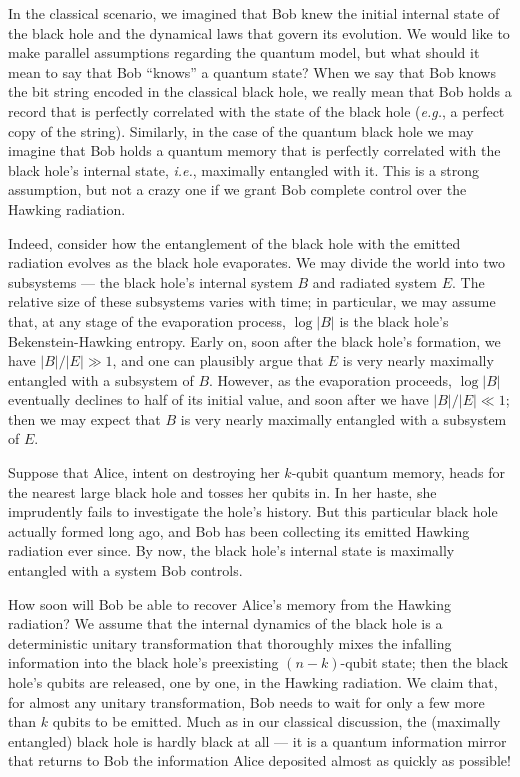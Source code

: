 \documentclass[12pt]{article}
\begin{document}
In the classical scenario, we imagined that Bob knew the initial internal state of the black hole and the dynamical laws that govern its evolution. We would like to make parallel assumptions regarding the quantum model, but what should it mean to say that Bob ``knows'' a quantum state? When we say that Bob knows the bit string encoded in the classical black hole, we really mean that Bob holds a record that is perfectly correlated with the state of the black hole ({\em e.g.}, a perfect copy of the string). Similarly, in the case of the quantum black hole we may imagine that Bob holds a quantum memory that is perfectly correlated with the black hole's internal state, {\em i.e.}, maximally entangled with it. This is a strong assumption, but not a crazy one if we grant Bob complete control over the Hawking radiation. 

Indeed, consider how the entanglement of the black hole with the emitted radiation evolves as the black hole evaporates. We may divide the world into two subsystems --- the black hole's internal system $B$ and radiated system $E$. The relative size  of these subsystems varies with time; in particular, we may assume that, at any stage of the evaporation process, $\log |B|$ is the black hole's Bekenstein-Hawking entropy. Early on, soon after the black hole's formation, we have $|B|/|E|\gg 1$, and one can plausibly argue \cite{page-entropy,lubkin,lloyd} that $E$ is very nearly maximally entangled with a subsystem of $B$. However, as the evaporation proceeds,  $\log |B|$ eventually declines to half of its initial value, and soon after we have $|B|/|E| \ll 1$; then we may expect that $B$ is very nearly maximally entangled with a subsystem of $E$.  

Suppose that Alice, intent on destroying her $k$-qubit quantum memory, heads for the nearest large black hole and tosses her qubits in. In her haste, she imprudently fails to investigate the hole's history. But this particular black hole actually formed long ago, and Bob has been collecting its emitted Hawking radiation ever since. By now, the black hole's internal state is maximally entangled with a system Bob controls.

How soon will Bob be able to recover Alice's memory from the Hawking radiation? We assume that the internal dynamics of the black hole is a deterministic unitary transformation that thoroughly mixes the infalling information into the black hole's preexisting $(n-k)$-qubit state; then the black hole's qubits are released, one by one, in the Hawking radiation.  We claim that, for almost any unitary transformation,  Bob needs to wait for only a few more than $k$ qubits to be emitted. Much as in our classical discussion, the (maximally entangled) black hole is hardly black at all --- it is a quantum information mirror that returns to Bob the information Alice deposited almost as quickly as possible!
\end{document}

